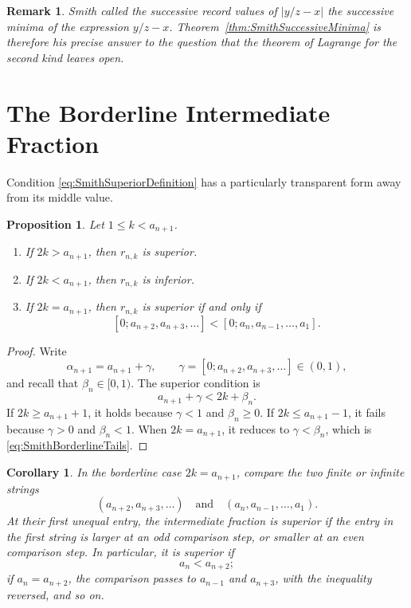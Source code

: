 \documentclass{book}
\newtheorem{proposition}[definition]{Proposition}
\newtheorem{remark}[definition]{Remark}
\newtheorem{corollary}[definition]{Corollary}
\begin{document}
\begin{remark}
  Smith called the successive record values of
  \(\lvert y/z-x\rvert\) the successive minima of the expression
  \(y/z-x\). Theorem~\ref{thm:SmithSuccessiveMinima} is therefore his precise
  answer to the question that the theorem of Lagrange for the second kind
  leaves open.
\end{remark}

\section{The Borderline Intermediate Fraction}

Condition \eqref{eq:SmithSuperiorDefinition} has a particularly transparent
form away from its middle value.

\begin{proposition}\label{prop:SmithHalfCriterion}
  Let \(1\leq k<a_{n+1}\).
  \begin{enumerate}
    \item If \(2k>a_{n+1}\), then \(r_{n,k}\) is superior.
    \item If \(2k<a_{n+1}\), then \(r_{n,k}\) is inferior.
    \item If \(2k=a_{n+1}\), then \(r_{n,k}\) is superior if and only if
      \begin{equation}\label{eq:SmithBorderlineTails}
        [0;a_{n+2},a_{n+3},\ldots]
        <
        [0;a_n,a_{n-1},\ldots,a_1].
      \end{equation}
  \end{enumerate}
\end{proposition}

\begin{proof}
  Write
  \[
    \alpha_{n+1}=a_{n+1}+\gamma,
    \qquad
    \gamma=[0;a_{n+2},a_{n+3},\ldots]\in(0,1),
  \]
  and recall that \(\beta_n\in[0,1)\). The superior condition is
  \[
    a_{n+1}+\gamma<2k+\beta_n.
  \]
  If \(2k\geq a_{n+1}+1\), it holds because \(\gamma<1\) and
  \(\beta_n\geq0\). If \(2k\leq a_{n+1}-1\), it fails because
  \(\gamma>0\) and \(\beta_n<1\). When \(2k=a_{n+1}\), it reduces to
  \(\gamma<\beta_n\), which is
  \eqref{eq:SmithBorderlineTails}.
\end{proof}

\begin{corollary}\label{cor:SmithLexicographicCriterion}
  In the borderline case \(2k=a_{n+1}\), compare the two finite or infinite
  strings
  \[
    (a_{n+2},a_{n+3},\ldots)
    \quad\text{and}\quad
    (a_n,a_{n-1},\ldots,a_1).
  \]
  At their first unequal entry, the intermediate fraction is superior if
  the entry in the first string is larger at an odd comparison step, or
  smaller at an even comparison step. In particular, it is superior if
  \[
    a_n<a_{n+2};
  \]
  if \(a_n=a_{n+2}\), the comparison passes to \(a_{n-1}\) and
  \(a_{n+3}\), with the inequality reversed, and so on.
\end{corollary}
\end{document}
